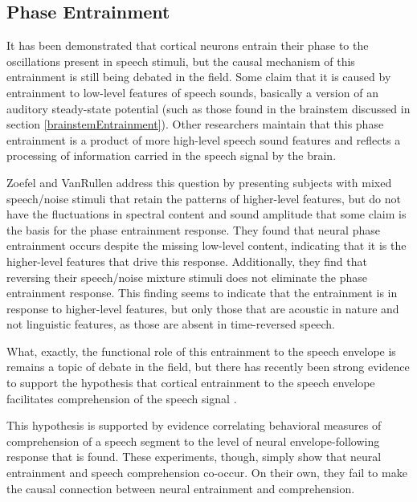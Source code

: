 \documentclass[titlepage]{article}
\begin{document}
  \subsection{Phase Entrainment}

    It has been demonstrated that cortical neurons entrain their phase to the oscillations present
    in speech stimuli, but the causal mechanism of this entrainment is still being debated in the field.
    Some claim that it is caused by entrainment to low-level features of speech sounds, basically a
    version of an auditory steady-state potential (such as those found in the brainstem discussed in
    section \ref{brainstemEntrainment}). Other researchers maintain that this phase entrainment is a
    product of more high-level speech sound features and reflects a processing of information
    carried in the speech signal by the brain.

    Zoefel and VanRullen \cite{Zoefel2016} address this
    question by presenting subjects with mixed speech/noise stimuli that retain the patterns of
    higher-level features, but do not have the fluctuations in spectral content and sound amplitude that
    some claim is the basis for the phase entrainment response. They found that neural phase entrainment
    occurs despite the missing low-level content, indicating that it is the higher-level features that
    drive this response. Additionally, they find that reversing their speech/noise mixture stimuli
    does not eliminate the phase entrainment response. This finding seems to indicate that the entrainment
    is in response to higher-level features, but only those that are acoustic in nature and not linguistic
    features, as those are absent in time-reversed speech.

    What, exactly, the functional role of this entrainment to the speech envelope
    is remains a topic of debate in the field, but there has recently been strong evidence
    to support the hypothesis that cortical entrainment to the speech
    envelope facilitates comprehension of the speech signal \cite{Ding2014a,Ding2012,OSullivan2015}.


    This hypothesis is supported by evidence correlating behavioral measures of comprehension
    of a speech segment to the level of neural envelope-following response that is found. These
    experiments, though, simply show that neural entrainment and speech comprehension co-occur. On
    their own, they fail to make the causal connection between neural entrainment and comprehension.
\end{document}
